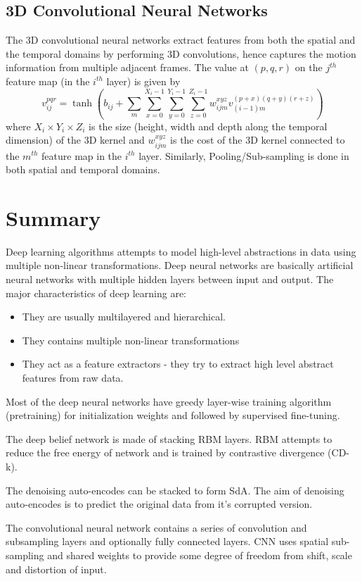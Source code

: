 \subsection{3D Convolutional Neural Networks}
The 3D convolutional neural networks extract features from both the spatial and the temporal domains by performing 3D convolutions, hence captures the motion information from multiple adjacent frames.\cite{ji20133d} The value at $(p, q, r)$ on the $j^{th}$ feature map (in the $i^{th}$ layer) is given by
$$v^{pqr}_{ij} = \tanh(b_{ij}+\sum_{m} \sum_{x=0}^{X_i-1} \sum_{y=0}^{Y_i-1} \sum_{z=0}^{Z_i-1} w^{xyz}_{ijm} v^{(p+x)(q+y)(r+z)}_{(i−1)m}) $$
where $X_i \times Y_i \times Z_i$ is the size (height, width and depth  along the temporal dimension) of the 3D kernel and $w^{xyz}_{ijm}$ is the cost of the 3D kernel connected to the $m^{th}$ feature map in the $i^{th}$ layer.  Similarly, Pooling/Sub-sampling is done in both spatial and temporal domains.

\section{Summary}
Deep learning algorithms attempts to model high-level abstractions in data using multiple non-linear transformations.  Deep neural networks are basically artificial neural networks with multiple hidden layers between input and output.  The major characteristics of deep learning are:
\begin{itemize}
\item They are usually multilayered and hierarchical.
\item They contains multiple non-linear transformations 
\item They act as a feature extractors - they try to extract high level abstract features from raw data.
\end{itemize}

Most of the deep neural networks have greedy layer-wise training algorithm (pretraining) for initialization weights and followed by supervised fine-tuning.
 
The deep belief network is made of stacking RBM layers.  RBM attempts to reduce the free energy of network and is trained by contrastive divergence (CD-k).

The denoising auto-encodes can be stacked to form SdA.  The aim of denoising auto-encodes is to predict the original data from it's corrupted version.

The convolutional neural network contains a series of convolution and subsampling layers and optionally fully connected layers.  CNN uses spatial sub-sampling and shared weights to provide some degree of freedom from shift, scale and distortion of input.
